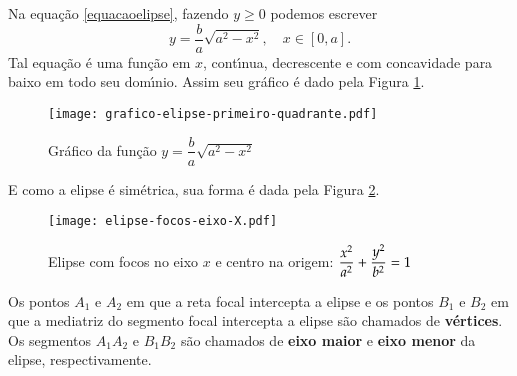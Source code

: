 Na equa\c{c}\~ao \eqref{equacaoelipse}, fazendo $y \ge 0$ podemos escrever
\[
  y = \dfrac{b}{a}\sqrt{a^2 - x^2},\quad x \in [0,a].
\]
Tal equa\c{c}\~ao \'e uma fun\c{c}\~ao em $x$, cont{\'\i}nua, decrescente e com concavidade para baixo em todo seu dom{\'\i}nio. Assim seu gr\'afico \'e dado pela Figura \ref{GraficoprimeiroquadranteElipse}.
\begin{figure}[h]
  \centering
  \caption{Gr\'afico da fun\c{c}\~ao $y = \dfrac{b}{a}\sqrt{a^2 - x^2}$}
  \label{GraficoprimeiroquadranteElipse}
  \texttt{[image: grafico-elipse-primeiro-quadrante.pdf]}
\end{figure}

E como a elipse \'e sim\'etrica, sua forma \'e dada pela Figura \ref{FormageralElipse}.
\begin{figure}[h]
  \centering
  \caption{Elipse com focos no eixo $x$ e centro na origem: $\dfrac{x^2}{a^2} + \dfrac{y^2}{b^2} = 1$}
  \label{FormageralElipse}
  \texttt{[image: elipse-focos-eixo-X.pdf]}
\end{figure}

\begin{definicao}
  Os pontos $A_1$ e $A_2$ em que a reta focal intercepta a elipse e os pontos $B_1$ e $B_2$ em que a mediatriz do segmento focal intercepta a elipse s\~ao chamados de \textbf{v\'ertices}. Os segmentos $A_1A_2$ e $B_1B_2$ s\~ao chamados de \textbf{eixo maior} e \textbf{eixo menor} da elipse, respectivamente.  
\end{definicao}

